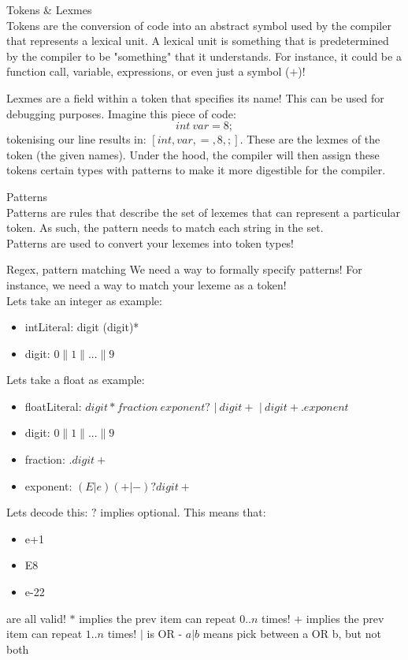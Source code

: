 \documentclass[journal, letterpaper]{IEEEtran}
\begin{document}
\begin{example}{Tokens \& Lexmes}\\
    Tokens are the conversion of code into an abstract symbol used by the compiler that
    represents a lexical unit. A lexical unit is something that is predetermined by the
    compiler to be "something" that it understands. For instance, it could be a function
    call, variable, expressions, or even just a symbol ($+$)!

    Lexmes are a field within a token that specifies its name! This can be used for
    debugging purposes. Imagine this piece of code:
    $$int\ var = 8;$$
    tokenising our line results in: $[int, var, =, 8, ;]$. These are the lexmes of the
    token (the given names). Under the hood, the compiler will then assign these tokens
    certain types with patterns to make it more digestible for the compiler.
\end{example}

\begin{theory}{Patterns}\\
    Patterns are rules that describe the set of lexemes that can represent a particular
    token. As such, the pattern needs to match each string in the set.\\

    Patterns are used to convert your lexemes into token types!
\end{theory}

\begin{example}{Regex, pattern matching}
    We need a way to formally specify patterns! For instance, we need a way to match your
    lexeme as a token!\\
    Lets take an integer as example:
    \begin{itemize}
        \item intLiteral: digit (digit)*
        \item digit: $0\|1\|...\|9$
    \end{itemize}
    Lets take a float as example:
    \begin{itemize}
        \item floatLiteral: $digit* fraction\ exponent?$
                $|\ digit+$
                $|\ digit+.exponent$
        \item digit: $0\|1\|...\|9$ 
        \item fraction: $.digit+$
        \item exponent: $(E|e)(+|-)?digit+$
    \end{itemize}
    Lets decode this: $?$ implies optional. This means that:
    \begin{itemize}
        \item e+1
        \item E8
        \item e-22
    \end{itemize}
    are all valid!
    $*$ implies the prev item can repeat $0..n$ times!
    $+$ implies the prev item can repeat $1..n$ times!
    $|$ is OR - $a|b$ means pick between a OR b, but not both
\end{example}
\end{document}
